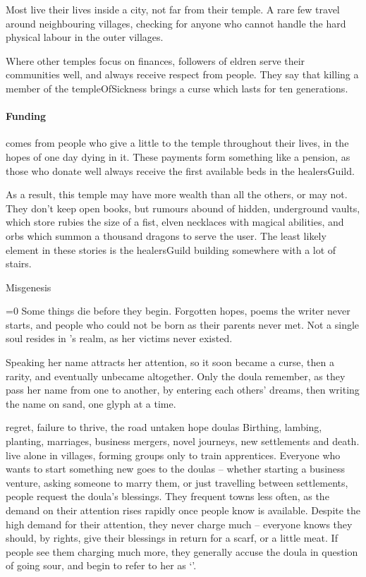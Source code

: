 \begin{multicols}{2}
Most live their lives inside a city, not far from their temple.
A rare few travel around neighbouring \glspl{village}, checking for anyone who cannot handle the hard physical labour in the outer \glspl{village}.

Where other temples focus on finances, followers of \gls{eldren} serve their communities well, and always receive respect from people.
They say that killing a member of the \gls{templeOfSickness} brings a curse which lasts for ten generations.

\paragraph{Funding}
comes from people who give a little to the temple throughout their lives, in the hopes of one day dying in it.
These payments form something like a pension, as those who donate well always receive the first available beds in the \gls{healersGuild}.

As a result, this temple may have more wealth than all the others, or may not.
They don't keep open books, but rumours abound of hidden, underground vaults, which store rubies the size of a fist, elven necklaces with magical abilities, and orbs which summon a thousand dragons to serve the user.
The least likely element in these stories is the \gls{healersGuild} building somewhere with a lot of stairs.

  {Misgenesis}%
  {
  \ifnum\value{temperature}=0\fi
  Some things die before they begin.
  Forgotten hopes, poems the writer never starts, and people who could not be born as their parents never met.
  Not a single soul resides in \hphantom{Nulla}'s realm, as her victims never existed.

  Speaking her name attracts her attention, so it soon became a curse, then a rarity, and eventually unbecame altogether.
  Only the \gls{doula} remember, as they pass her name from one to another, by entering each others' dreams, then writing the name on sand, one glyph at a time.
  }%
  {regret, failure to thrive, the road untaken}%
  {hope}%
  {\Glspl{doula}}%
  {
    Birthing, lambing, planting, marriages, business mergers, novel journeys, new settlements and death.
  }%
live alone in \glspl{village}, forming groups only to train apprentices.
Everyone who wants to start something new goes to the \glspl{doula} -- whether starting a business venture, asking someone to marry them, or just travelling between settlements, people request the \gls{doula}'s blessings.
They frequent towns less often, as the demand on their attention rises rapidly once people know  is available.
Despite the high demand for their attention, they never charge much -- everyone knows they should, by rights, give their blessings in return for a scarf, or a little meat.
If people see them charging much more, they generally accuse the \gls{doula} in question of going sour, and begin to refer to her as `'.


\end{multicols}
